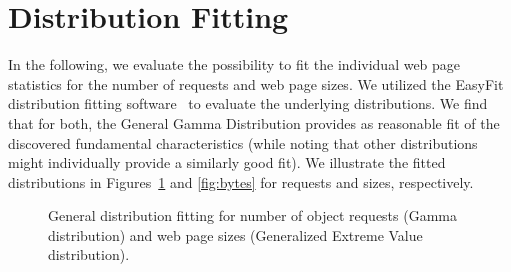 \documentclass[letterpaper,conference]{IEEEtran}
\begin{document}
\section{Distribution Fitting}
In the following, we evaluate the possibility to fit the individual web page statistics for the number of requests and web page sizes. 
We utilized the EasyFit distribution fitting software~\cite{Ma13} to evaluate the underlying distributions. 
We find that for both, the General Gamma Distribution provides as reasonable fit of the discovered fundamental characteristics (while noting that other distributions might individually provide a similarly good fit). 
We illustrate the fitted distributions in Figures~\ref{fig:reqs} and \ref{fig:bytes} for requests and sizes, respectively.
\begin{figure}[]
	\centering
	\label{fig:freqs}
	
	\label{fig:mreqs}
	\caption{General distribution fitting for number of object requests (Gamma distribution) and web page sizes (Generalized Extreme Value distribution).\label{fig:reqs}}
\end{figure}
\end{document}
